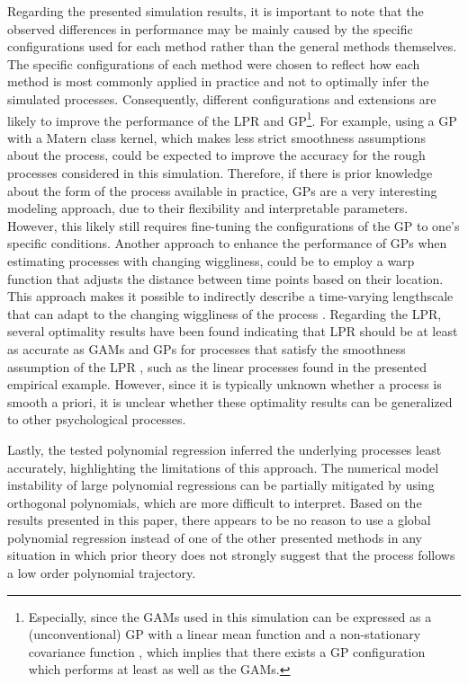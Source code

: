 \documentclass[man, floatsintext]{apa7}
\begin{document}
Regarding the presented simulation results, it is important to note that the
observed differences in performance may be mainly caused by the specific
configurations used for each method rather than the general methods themselves.
The specific configurations of each method were chosen to reflect how each
method is most commonly applied in practice and not to optimally infer the
simulated processes. Consequently, different configurations and extensions are
likely to improve the performance of the LPR and GP\footnote{Especially, since
  the GAMs used in this simulation can be expressed as a (unconventional) GP
  with
  a linear mean function and a non-stationary covariance function
  \parencite{wahba_improper_1978, rasmussen_gaussian_2006}, which implies that
  there exists a GP configuration which performs at least as well as the
  GAMs.}.
For example, using a GP with a Matern class kernel, which makes less strict
smoothness assumptions about the process, could be expected to improve the
accuracy for the rough processes considered in this simulation. Therefore, if
there is prior knowledge about the form of the process available in practice,
GPs are a very interesting modeling approach, due to their flexibility and
interpretable parameters. However, this likely still requires fine-tuning the
configurations of the GP to one's specific conditions. Another approach to
enhance the performance of GPs when estimating processes with changing
wiggliness, could be to employ a warp function that adjusts the distance
between time points based on their location. This approach makes it possible to
indirectly describe a time-varying lengthscale that can adapt to the changing
wiggliness of the process \parencite{tolpin_warped_2019}. Regarding the LPR,
several optimality results have been found indicating that LPR should be at
least as accurate as GAMs and GPs for processes that satisfy the smoothness
assumption of the LPR \parencite{fan_local_1997}, such as the linear processes
found in the presented empirical example. However, since it is typically
unknown whether a process is smooth a priori, it is unclear whether these
optimality results can be generalized to other psychological processes.

Lastly, the tested polynomial regression inferred the underlying processes
least accurately, highlighting the limitations of this approach. The numerical
model instability of large polynomial regressions can be partially mitigated by
using orthogonal polynomials, which are more difficult to interpret. Based on
the results presented in this paper, there appears to be no reason to use a
global polynomial regression instead of one of the other presented methods in
any situation in which prior theory does not strongly suggest that the process
follows a low order polynomial trajectory.
\end{document}
